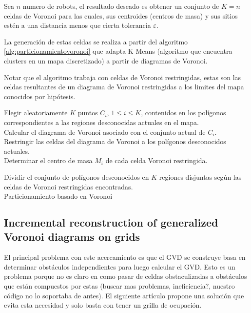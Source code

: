 Sea $n$ numero de robots, el resultado deseado es obtener un conjunto de $K=n$ celdas de Voronoi para las cuales, sus centroides (centros de masa) y sus sitios estén a una distancia menos que cierta tolerancia $\varepsilon$. %

La generación de estas celdas se realiza a partir del algoritmo \ref{alg:particionamientovoronoi} que adapta K-Means (algoritmo que encuentra clusters en un mapa discretizado) a partir de diagramas de Voronoi.

Notar que el algoritmo trabaja con celdas de Voronoi restringidas, estas son las celdas resultantes de un diagrama de Voronoi restringidas a los limites del mapa conocidos por hipótesis.

\begin{algorithm}
\SetAlgoLined
    Elegir aleatoriamente $K$ puntos $C_i$, $1 \leq i \leq K$, contenidos en los polígonos correspondientes a las regiones desconocidas actuales en el mapa.\\
    Calcular el diagrama de Voronoi asociado con el conjunto actual de $C_i$.\\
    Restringir las celdas del diagrama de Voronoi a los polígonos desconocidos actuales.\\
    Determinar el centro de masa $M_i$ de cada celda Voronoi restringida.\\
    
    Dividir el conjunto de polígonos desconocidos en $K$ regiones disjuntas según las celdas de Voronoi restringidas encontradas.\\
    \caption{Particionamiento basado en Voronoi}
    \label{alg:particionamientovoronoi}
    
\end{algorithm}


\subsection{Incremental reconstruction of generalized Voronoi diagrams on grids}

El principal problema con este acercamiento es que el GVD se construye basa en determinar obstáculos independientes para luego calcular el GVD. Esto es un problema porque no es claro en como pasar de celdas obstaculizadas a obstáculos que están compuestos por estas (buscar mas problemas, ineficiencia?, nuestro código no lo soportaba de antes).  El siguiente artículo propone una solución que evita esta necesidad y solo basta con tener un grilla de ocupación.

